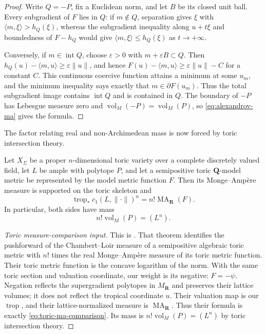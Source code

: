 \begin{proof}
Write $Q=-P$, fix a Euclidean norm, and let $B$ be its closed unit ball.
Every subgradient of $F$ lies in
$Q$: if $m\notin Q$, separation gives $\xi$ with
$\langle m,\xi\rangle>h_Q(\xi)$, whereas the subgradient inequality along
$u+t\xi$ and boundedness of $F-h_Q$ would give
$\langle m,\xi\rangle\leq h_Q(\xi)$ as $t\to+\infty$.

Conversely, if $m\in\operatorname{int}Q$, choose $\varepsilon>0$ with
$m+\varepsilon B\subset Q$.  Then
$h_Q(u)-\langle m,u\rangle\geq\varepsilon\|u\|$, and hence
$F(u)-\langle m,u\rangle\geq\varepsilon\|u\|-C$ for a constant $C$.
This continuous coercive function attains a minimum at some $u_m$, and the
minimum inequality says exactly that $m\in\partial F(u_m)$.  Thus the total
subgradient image contains $\operatorname{int}Q$ and is contained in $Q$.
The boundary of $-P$ has Lebesgue measure zero and
$\operatorname{vol}_M(-P)=\operatorname{vol}_M(P)$, so
\eqref{eq:alexandrov-ma} gives the formula.
\end{proof}

The factor relating real and non-Archimedean mass is now forced by toric
intersection theory.

\begin{theorem}\label{thm:toric-ma-comparison}
Let $X_\Sigma$ be a proper $n$-dimensional toric variety over a complete
discretely valued field, let $L$ be ample with polytope $P$, and let a
semipositive toric $\mathbf Q$-model metric be represented by the model
metric function $F$.  Then its Monge--Amp\`ere measure is supported on the
toric skeleton and
\begin{equation}
\label{eq:toric-ma-comparison}
 \operatorname{trop}_*c_1(L,\|\cdot\|)^n
 =n!\operatorname{MA}_{\mathbf R}(F).
\end{equation}
In particular, both sides have mass
\[
                         n!\operatorname{vol}_M(P)=(L^n).
\]
\end{theorem}

\begin{proof}[Toric measure-comparison input]
This is \cite[Theorem~5.70]{BGPS14}.  That theorem identifies the pushforward
of the Chambert--Loir measure of a semipositive algebraic toric metric with
$n!$ times the real Monge--Amp\`ere measure of its toric metric function.
Their toric metric function is the concave logarithm of the norm.  With the
same toric section and valuation coordinate, our weight is its negative:
$F=-\psi$.  Negation reflects the supergradient polytopes in $M_{\mathbf R}$
and preserves their lattice volumes; it does not reflect the tropical
coordinate $u$.  Their valuation
map is our $\operatorname{trop}$, and their lattice-normalized measure is
$\operatorname{MA}_{\mathbf R}$.  Thus their formula is exactly
\eqref{eq:toric-ma-comparison}.  Its mass is
$n!\operatorname{vol}_M(P)=(L^n)$ by toric intersection theory.
\end{proof}

